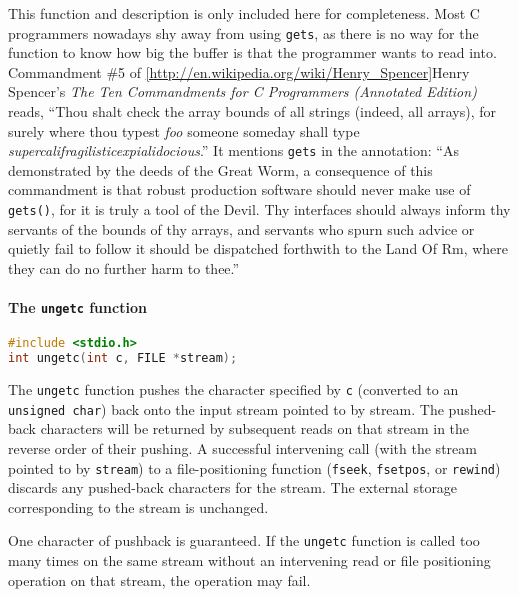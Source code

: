 This function and description is only included here for completeness. Most C
programmers nowadays shy away from using \texttt{gets}, as there is no way for
the function to know how big the buffer is that the programmer wants to read
into. Commandment \#5 of
\ref{http://en.wikipedia.org/wiki/Henry_Spencer}{Henry Spencer}'s \emph{The
Ten Commandments for C Programmers (Annotated Edition)} reads, ``Thou shalt
check the array bounds of all strings (indeed, all arrays), for surely where
thou typest \emph{foo} someone someday shall type
\emph{supercalifragilisticexpialidocious}.'' It mentions \texttt{gets} in the
annotation: ``As demonstrated by the deeds of the Great Worm, a consequence of
this commandment is that robust production software should never make use of
\texttt{gets()}, for it is truly a tool of the Devil. Thy interfaces should
always inform thy servants of the bounds of thy arrays, and servants who spurn
such advice or quietly fail to follow it should be dispatched forthwith to the
Land Of Rm, where they can do no further harm to thee.''

\paragraph{The \texttt{ungetc} function}
\lstset{basicstyle=\scriptsize, numbers=left, captionpos=b, tabsize=4}
\begin{lstlisting}[caption=Section \thesection listing \arabic{filecnt},language={C},
breaklines=true,xleftmargin=15pt,label=lst:section\thesection listing\arabic{filecnt}]
#include <stdio.h>
int ungetc(int c, FILE *stream);
\end{lstlisting}

The \texttt{ungetc} function pushes the character specified by \texttt{c}
(converted to an \texttt{unsigned char}) back onto the input stream pointed to
by stream. The pushed-back characters will be returned by subsequent reads on
that stream in the reverse order of their pushing. A successful intervening
call (with the stream pointed to by \texttt{stream}) to a file-positioning
function (\texttt{fseek}, \texttt{fsetpos}, or \texttt{rewind}) discards any
pushed-back characters for the stream. The external storage corresponding to
the stream is unchanged.

One character of pushback is guaranteed. If the \texttt{ungetc} function is
called too many times on the same stream without an intervening read or file
positioning operation on that stream, the operation may fail.


